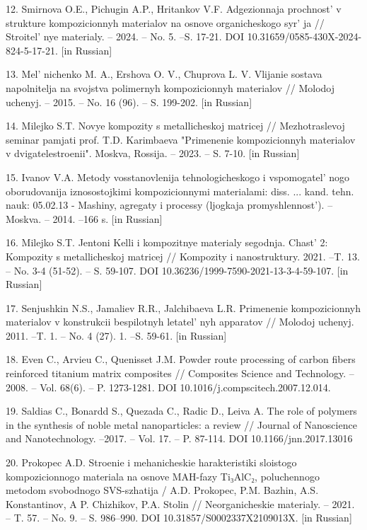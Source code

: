 \begin{references}
12. Smirnova O.E., Pichugin A.P., Hritankov V.F. Adgezionnaja
prochnost'{} v strukture kompozicionnyh materialov na
osnove organicheskogo syr' ja //
Stroitel' nye materialy. -- 2024. -- No. 5. --S. 17-21.
DOI 10.31659/0585-430X-2024-824-5-17-21. {[}in Russian{]}

13. Mel' nichenko M. A., Ershova O. V., Chuprova L. V.
Vlijanie sostava napolnitelja na svojstva polimer\-nyh kompozicionnyh
materialov // Molodoj uchenyj. -- 2015. -- No. 16 (96). -- S. 199-202.
{[}in Russian{]}

14. Milejko S.T. Novye kompozity s metallicheskoj matricej //
Mezhotraslevoj seminar pamjati prof. T.D. Karimbaeva "Primenenie
kompozicionnyh materialov v dvigatelestroenii". Moskva, Rossija. --
2023. -- S. 7-10. {[}in Russian{]}

15. Ivanov V.A. Metody vosstanovlenija tehnologicheskogo i
vspomogatel' nogo oborudovanija iznosostoj\-kimi
kompozicionnymi materialami: diss. ... kand. tehn. nauk: 05.02.13 -
Mashiny, agregaty i processy (ljogkaja promyshlennost').
-- Moskva. -- 2014. --166 s. {[}in Russian{]}

16. Milejko S.T. Jentoni Kelli i kompozitnye materialy segodnja.
Chast'{} 2: Kompozity s metallicheskoj matricej //
Kompozity i nanostruktury. 2021. --T. 13. -- No. 3-4 (51-52). -- S.
59-107. DOI 10.36236/1999-7590-2021-13-3-4-59-107. {[}in Russian{]}

17. Senjushkin N.S., Jamaliev R.R., Jalchibaeva L.R. Primenenie
kompozicionnyh materialov v konstrukcii bespilotnyh
letatel' nyh apparatov // Molodoj uchenyj. 2011. --T. 1.
-- No. 4 (27). 1. --S. 59-61. {[}in Russian{]}

18. Even C., Arvieu C., Quenisset J.M. Powder route processing of carbon
fibers reinforced titanium matrix composites // Composites Science and
Technology. -- 2008. -- Vol. 68(6). -- P. 1273-1281. DOI
10.1016/j.compscitech.2007.12.014.

19. Saldias C., Bonardd S., Quezada C., Radic D., Leiva A. The role of
polymers in the synthesis of noble metal nanoparticles: a review //
Journal of Nanoscience and Nanotechnology. --2017. -- Vol. 17. -- P.
87-114. DOI 10.1166/jnn.2017.13016

20. Prokopec A.D. Stroenie i mehanicheskie harakteristiki sloistogo
kompozicionnogo materiala na osnove MAH-fazy Ti₃AlC₂, poluchennogo
metodom svobodnogo SVS-szhatija / A.D. Prokopec, P.M. Bazhin, A.S.
Konstantinov, A P. Chizhikov, P.A. Stolin // Neorganicheskie materialy.
-- 2021. -- T. 57. -- No. 9. -- S. 986--990. DOI
10.31857/S0002337X2109013X. {[}in Russian{]}


\end{references}
